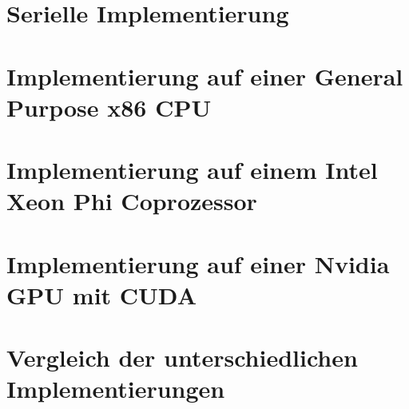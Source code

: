 \documentclass[12pt,oneside, 
liststotoc, 						%
bibtotoc,						%
titlepage, 						%
abstracton,					%
DIV11,						%
]{scrreprt}
\begin{document}
\chapter{Serielle Implementierung}

\clearpage

\chapter{Implementierung auf einer General Purpose x86 CPU}

\clearpage

\chapter{Implementierung auf einem Intel Xeon Phi Coprozessor}

\clearpage

\chapter{Implementierung auf einer Nvidia GPU mit CUDA} \label{chap:cuda}

\clearpage

\chapter{Vergleich der unterschiedlichen Implementierungen}

\clearpage

\printbibliography
\clearpage
\end{document}
